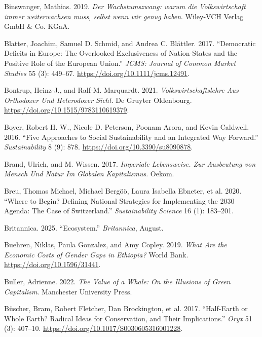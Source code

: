 \documentclass[
  a4paper,
  DIV=11,
  numbers=noendperiod,
  oneside,
  openany]{scrreprt}
\newlength{\cslhangindent}
\newenvironment{CSLReferences}[2] %
 {\begin{list}{}{%
  \setlength{\itemindent}{0pt}
  \setlength{\leftmargin}{0pt}
  \setlength{\parsep}{0pt}
  \ifodd #1
   \setlength{\leftmargin}{\cslhangindent}
   \setlength{\itemindent}{-1\cslhangindent}
  \fi
  \setlength{\itemsep}{#2\baselineskip}}}
 {\end{list}}
\begin{document}
\begin{CSLReferences}{1}{1}
Binswanger, Mathias. 2019. \emph{{Der Wachstumszwang: warum die
Volkswirtschaft immer weiterwachsen muss, selbst wenn wir genug haben}}.
Wiley-VCH Verlag GmbH \& Co. KGaA.

Blatter, Joachim, Samuel D. Schmid, and Andrea C. Blättler. 2017.
{``Democratic {Deficits} in {Europe}: {The Overlooked Exclusiveness} of
{Nation-States} and the {Positive Role} of the {European Union}.''}
\emph{JCMS: Journal of Common Market Studies} 55 (3): 449--67.
\url{https://doi.org/10.1111/jcms.12491}.

Bontrup, Heinz-J., and Ralf-M. Marquardt. 2021.
\emph{Volkswirtschaftslehre Aus Orthodoxer Und Heterodoxer {Sicht}}. De
Gruyter Oldenbourg. \url{https://doi.org/10.1515/9783110619379}.

Boyer, Robert H. W., Nicole D. Peterson, Poonam Arora, and Kevin
Caldwell. 2016. {``Five {Approaches} to {Social Sustainability} and an
{Integrated Way Forward}.''} \emph{Sustainability} 8 (9): 878.
\url{https://doi.org/10.3390/su8090878}.

Brand, Ulrich, and M. Wissen. 2017. \emph{Imperiale {Lebensweise}. {Zur}
{Ausbeutung} von {Mensch} Und {Natur} Im Globalen {Kapitalismus}}.
Oekom.

Breu, Thomas Michael, Michael Bergöö, Laura Isabella Ebneter, et al.
2020. {``Where to Begin? {Defining} National Strategies for Implementing
the 2030 {Agenda}: The Case of {Switzerland}.''} \emph{Sustainability
Science} 16 (1): 183--201.

Britannica. 2025. {``Ecosystem.''} \emph{Britannica}, August.

Buehren, Niklas, Paula Gonzalez, and Amy Copley. 2019. \emph{What {Are}
the {Economic Costs} of {Gender Gaps} in {Ethiopia}?} World Bank.
\url{https://doi.org/10.1596/31441}.

Buller, Adrienne. 2022. \emph{The {Value} of a {Whale}: {On} the
{Illusions} of {Green Capitalism}}. Manchester University Press.

Büscher, Bram, Robert Fletcher, Dan Brockington, et al. 2017.
{``Half-{Earth} or {Whole Earth}? {Radical} Ideas for Conservation, and
Their Implications.''} \emph{Oryx} 51 (3): 407--10.
\url{https://doi.org/10.1017/S0030605316001228}.


\end{CSLReferences}
\end{document}
